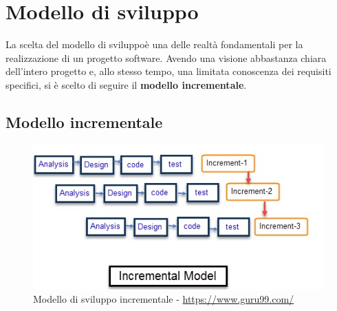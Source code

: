 \section{Modello di sviluppo}
La scelta del modello di sviluppo\glosp è una delle realtà fondamentali per la realizzazione di un progetto software.
Avendo una visione abbastanza chiara dell'intero progetto e, allo stesso tempo, una limitata conoscenza dei requisiti specifici, si è scelto di seguire il \textbf{modello incrementale}.

\subsection{Modello incrementale}

\begin{figure}[H]
	\includegraphics[width=0.99\linewidth]{res/images/incremental_model.jpg}
	\caption{Modello di sviluppo incrementale - \url{https://www.guru99.com/}}
\end{figure}

